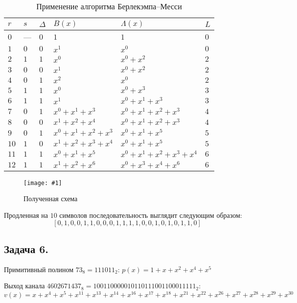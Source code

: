 \documentclass{article}
\newcommand{\image}[3]{%
    \begin{figure}[H]
        \centering
        \texttt{[image: \#1]}
        \caption{#2}
        \label{img:#1}
    \end{figure}
}
\begin{document}
\begin{table}[H]
\centering
\caption{Применение алгоритма Берлекэмпа–Месси}
\begin{tabular}{|l|l|l|l|l|l|}
\hline
$r$     &   $s$     &   $\Delta$     &  $B(x)$     &   $\Lambda(x)$ & $L$ \\ \hline
$0$ & {---} & $0$ & $1$ & $1$ & $0$ \\
$1$ & $0$ & $0$ & $x^1$ & $x^0$ & $0$ \\
$2$ & $1$ & $1$ & $x^0$ & $x^0+x^2$ & $2$ \\
$3$ & $0$ & $0$ & $x^1$ & $x^0+x^2$ & $2$ \\
$4$ & $0$ & $1$ & $x^2$ & $x^0$ & $2$ \\
$5$ & $1$ & $1$ & $x^0$ & $x^0+x^3$ & $3$ \\
$6$ & $1$ & $1$ & $x^1$ & $x^0+x^1+x^3$ & $3$ \\
$7$ & $0$ & $1$ & $x^0+x^1+x^3$ & $x^0+x^1+x^2+x^3$ & $4$ \\
$8$ & $0$ & $0$ & $x^1+x^2+x^4$ & $x^0+x^1+x^2+x^3$ & $4$ \\
$9$ & $0$ & $1$ & $x^0+x^1+x^2+x^3$ & $x^0+x^1+x^5$ & $5$ \\
$10$ & $1$ & $0$ & $x^1+x^2+x^3+x^4$ & $x^0+x^1+x^5$ & $5$ \\
$11$ & $1$ & $1$ & $x^0+x^1+x^5$ & $x^0+x^1+x^2+x^3+x^4$ & $6$ \\
$12$ & $1$ & $1$ & $x^1+x^2+x^6$ & $x^0+x^3+x^4+x^6$ & $6$ \\
\hline
\end{tabular}
\end{table}
%
%
\image {task71.png} {Полученная схема} {\textwidth}
%
Продленная на $10$ символов последовательность выглядит следующим образом:
$$[0, 1, 0, 0, 1, 1, 0, 0, 0, 1, 1, 1, 1, 0, 0, 1, 0, 1, 0, 1, 1, 0]$$
\subsection{Задача 6.}
%
Примитивный полином $73_{8}=111 011_{2}$: $p(x) = 1 + x + x^{2} + x^{4} + x^{5}$

Выход канала $4602671437_{8}=100110000010110111001100011111_{2}$: $v(x) = x + x^{4} + x^{5} + x^{11} + x^{13} + x^{14} + x^{16} + x^{17} + x^{18} + x^{21} + x^{22} + x^{26} + x^{27} + x^{28} + x^{29} + x^{30}$ 
\end{document}
